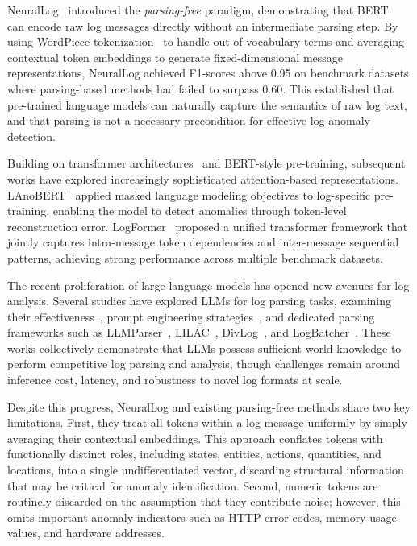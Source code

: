 NeuralLog~\cite{neurallog2021} introduced the \textit{parsing-free} paradigm, demonstrating that BERT~\cite{devlin2018bert} can encode raw log messages directly without an intermediate parsing step. By using WordPiece tokenization~\cite{schuster2012japanese} to handle out-of-vocabulary terms and averaging contextual token embeddings to generate fixed-dimensional message representations, NeuralLog achieved F1-scores above 0.95 on benchmark datasets where parsing-based methods had failed to surpass 0.60. This established that pre-trained language models can naturally capture the semantics of raw log text, and that parsing is not a necessary precondition for effective log anomaly detection.

Building on transformer architectures~\cite{vaswani2017attention} and BERT-style pre-training, subsequent works have explored increasingly sophisticated attention-based representations. LAnoBERT~\cite{lee2023lanobert} applied masked language modeling objectives to log-specific pre-training, enabling the model to detect anomalies through token-level reconstruction error. LogFormer~\cite{guo2024logformer} proposed a unified transformer framework that jointly captures intra-message token dependencies and inter-message sequential patterns, achieving strong performance across multiple benchmark datasets.


The recent proliferation of large language models has opened new avenues for log analysis. Several studies have explored LLMs for log parsing tasks, examining their effectiveness~\cite{wu2023effectiveness}, prompt engineering strategies~\cite{le2023prompt}, and dedicated parsing frameworks such as LLMParser~\cite{ma2024llmparser}, LILAC~\cite{jiang2024lilac}, DivLog~\cite{xu2024divlog}, and LogBatcher~\cite{xiao2024logbatcher}. These works collectively demonstrate that LLMs possess sufficient world knowledge to perform competitive log parsing and analysis, though challenges remain around inference cost, latency, and robustness to novel log formats at scale.


Despite this progress, NeuralLog and existing parsing-free methods share two key limitations. First, they treat all tokens within a log message uniformly by simply averaging their contextual embeddings. This approach conflates tokens with functionally distinct roles, including states, entities, actions, quantities, and locations, into a single undifferentiated vector, discarding structural information that may be critical for anomaly identification. Second, numeric tokens are routinely discarded on the assumption that they contribute noise; however, this omits important anomaly indicators such as HTTP error codes, memory usage values, and hardware addresses.


